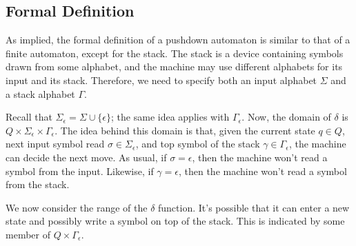 \documentclass[letterpaper]{article}
\begin{document}
\subsection{Formal Definition}
As implied, the formal definition of a pushdown automaton is similar to that of a finite automaton, except for the stack. The stack is a device containing symbols drawn from some alphabet, and the machine may use different alphabets for its input and its stack. Therefore, we need to specify both an input alphabet $\Sigma$ and a stack alphabet $\Gamma$. 

\bigskip 

Recall that $\Sigma_{\epsilon} = \Sigma \cup \{\epsilon\}$; the same idea applies with $\Gamma_{\epsilon}$. Now, the domain of $\delta$ is $Q \times \Sigma_{\epsilon} \times \Gamma_{\epsilon}$. The idea behind this domain is that, given the current state $q \in Q$, next input symbol read $\sigma \in \Sigma_{\epsilon}$, and top symbol of the stack $\gamma \in \Gamma_{\epsilon}$, the machine can decide the next move. As usual, if $\sigma = \epsilon$, then the machine won't read a symbol from the input. Likewise, if $\gamma = \epsilon$, then the machine won't read a symbol from the stack.  

\bigskip 

We now consider the range of the $\delta$ function. It's possible that it can enter a new state and possibly write a symbol on top of the stack. This is indicated by some member of $Q \times \Gamma_{\epsilon}$. 
\end{document}
